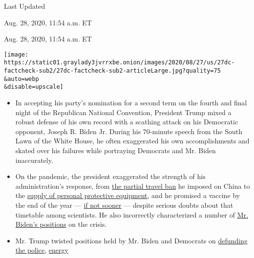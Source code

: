 Last Updated

Aug. 28, 2020, 11:54 a.m. ET

Aug. 28, 2020, 11:54 a.m. ET

\texttt{[image: https://static01.graylady3jvrrxbe.onion/images/2020/08/27/us/27dc-factcheck-sub2/27dc-factcheck-sub2-articleLarge.jpg?quality=75\\\&auto=webp\\\&disable=upscale]}

\begin{itemize}
\item
  In accepting his party's nomination for a second term on the fourth
  and final night of the Republican National Convention, President Trump
  mixed a robust defense of his own record with a scathing attack on his
  Democratic opponent, Joseph R. Biden Jr. During his 70-minute speech
  from the South Lawn of the White House, he often exaggerated his own
  accomplishments and skated over his failures while portraying
  Democrats and Mr. Biden inaccurately.
\item
  On the pandemic, the president exaggerated the strength of his
  administration's response, from
  \href{https://www.nytimes3xbfgragh.onion/live/2020/08/27/us/rnc-fact-check\#when-i-took-bold-action-to-issue-a-travel-ban-on-china-very-early-indeed-joe-biden-called-it-hysterical-and-xenophobic}{the
  partial travel ban} he imposed on China to the
  \href{https://www.nytimes3xbfgragh.onion/live/2020/08/27/us/rnc-fact-check\#we-shipped-hundreds-of-millions-of-masks-gloves-and-gowns-to-our-front-line-health-care-workers}{supply
  of personal protective equipment}, and he promised a vaccine by the
  end of the year ---
  \href{https://www.nytimes3xbfgragh.onion/live/2020/08/27/us/rnc-fact-check\#we-are-delivering-lifesaving-therapies-and-will-produce-a-vaccine-before-the-end-of-the-year-or-maybe-even-sooner}{if
  not sooner} --- despite serious doubts about that timetable among
  scientists. He also incorrectly characterized a number of
  \href{https://www.nytimes3xbfgragh.onion/live/2020/08/27/us/rnc-fact-check\#instead-of-following-the-science-joe-biden-wants-to-inflict-a-painful-shutdown-on-the-entire-country}{Mr.
  Biden's positions} on the crisis.
\item
  Mr. Trump twisted positions held by Mr. Biden and Democrats on
  \href{https://www.nytimes3xbfgragh.onion/live/2020/08/27/us/rnc-fact-check\#make-no-mistake-if-you-give-power-to-joe-biden-the-radical-left-will-defund-police-departments-all-across-america}{defunding
  the police},
  \href{https://www.nytimes3xbfgragh.onion/live/2020/08/27/us/rnc-fact-check\#biden-has-promised-to-abolish-the-production-of-american-oil-coal-shale-and-natural-gas-these-same-policies-led-to-crippling-pow}{energy
}
\end{itemize}
